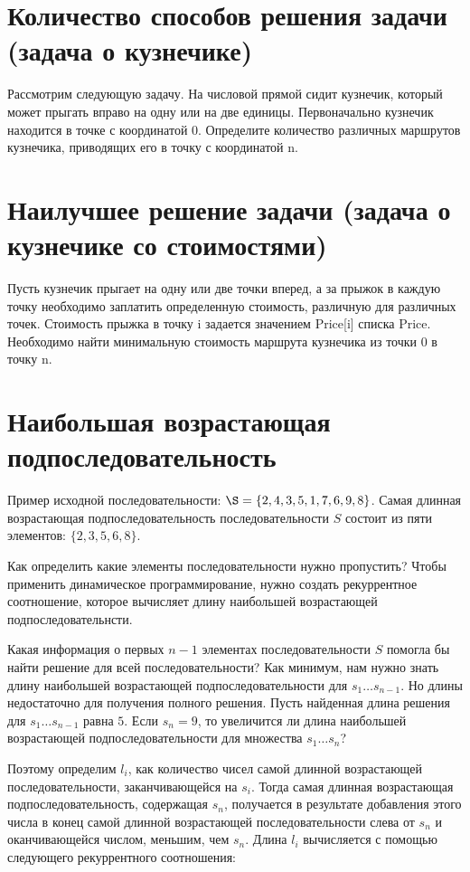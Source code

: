 \documentclass[14pt,openany]{book}
\begin{document}
\section{Количество способов решения задачи (задача о кузнечике)}

Рассмотрим следующую задачу. На числовой прямой сидит кузнечик, который может прыгать вправо на одну или на две единицы. Первоначально кузнечик находится в точке с координатой 0. Определите количество различных маршрутов кузнечика, приводящих его в точку с координатой n.

\section{Наилучшее решение задачи (задача о кузнечике со стоимостями)}

Пусть кузнечик прыгает на одну или две точки вперед, а за прыжок в каждую точку необходимо заплатить определенную стоимость, различную для различных точек. Стоимость прыжка в точку i задается значением Price[i] списка Price. Необходимо найти минимальную стоимость маршрута кузнечика из точки 0 в точку n.

\section{Наибольшая возрастающая подпоследовательность}

Пример исходной последовательности: $\S=\{2,4,3,5,1,7,6,9,8\}$. Самая длинная возрастающая
подпоследовательность последовательности $S$ состоит из пяти элементов: $\{2,3,5,6,8\}$.

Как определить какие элементы последовательности нужно пропустить? Чтобы применить динамическое
программирование, нужно создать рекуррентное соотношение, которое вычисляет длину
наибольшей возрастающей подпоследовательнсти.

Какая информация о первых $n-1$ элементах последовательности $S$ помогла бы найти решение для
всей последовательности? Как минимум, нам нужно знать длину наибольшей возрастающей 
подпоследовательности для $s_1 \ldots s_{n-1}$. Но длины недостаточно для получения полного
решения. Пусть найденная длина решения для $s_1 \ldots s_{n-1}$ равна $5$. Если $s_n = 9$,
то увеличится ли длина наибольшей возрастающей подпоследовательности для множества
$s_1 \ldots s_n$?

Поэтому определим $l_i$, как количество чисел самой длинной возрастающей последовательности,
заканчивающейся на $s_i$. Тогда самая длинная возрастающая подпоследовательность, содержащая
$s_n$, получается в результате добавления этого числа в конец самой длинной возрастающей
последовательности слева от $s_n$ и оканчивающейся числом, меньшим, чем $s_n$. Длина $l_i$
вычисляется с помощью следующего рекуррентного соотношения:
\end{document}
